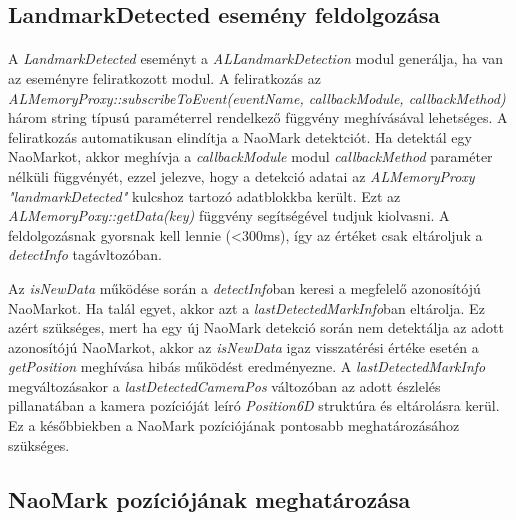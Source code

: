 \documentclass{article}
\numberwithin{figure}{section}
\begin{document}
\begin{sloppypar}
		\subsection{LandmarkDetected esemény feldolgozása}
		\paragraph{}
		A \textit{LandmarkDetected} eseményt a \textit{ALLandmarkDetection} modul generálja, ha van az eseményre feliratkozott modul. A feliratkozás az \textit{ALMemoryProxy::subscribeToEvent(eventName, callbackModule,  callbackMethod)} három string típusú paraméterrel rendelkező függvény meghívásával lehetséges. A feliratkozás automatikusan elindítja a NaoMark detektciót. Ha detektál egy NaoMarkot, akkor meghívja a \textit{callbackModule} modul \textit{callbackMethod} paraméter nélküli függvényét, ezzel jelezve, hogy a detekció adatai az \textit{ALMemoryProxy} \textit{"landmarkDetected"} kulcshoz tartozó adatblokkba került. Ezt az \textit{ALMemoryPoxy::getData(key)} függvény segítségével tudjuk kiolvasni. A feldolgozásnak gyorsnak kell lennie (\textless 300ms), így az értéket csak eltároljuk a \textit{detectInfo} tagávltozóban. \par
		Az \textit{isNewData} működése során a \textit{detectInfo}ban keresi a megfelelő azonosítójú NaoMarkot. Ha talál  egyet, akkor azt a \textit{lastDetectedMarkInfo}ban eltárolja. Ez azért szükséges, mert ha egy új NaoMark detekció során nem detektálja az adott azonosítójú NaoMarkot, akkor az \textit{isNewData} igaz visszatérési értéke esetén a \textit{getPosition} meghívása hibás működést eredményezne. A \textit{lastDetectedMarkInfo} megváltozásakor a \textit{lastDetectedCameraPos} változóban az adott észlelés pillanatában a kamera pozícióját leíró \textit{Position6D} struktúra és eltárolásra kerül. Ez a későbbiekben a NaoMark pozíciójának pontosabb meghatározásához szükséges.
		
		\subsection{NaoMark pozíciójának meghatározása}

\end{sloppypar}
\end{document}
